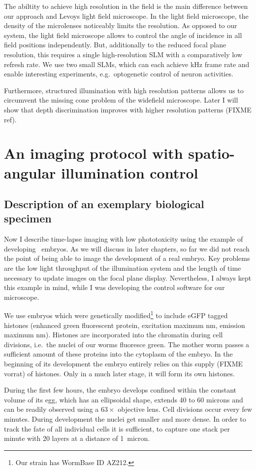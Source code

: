 The abiltity to achieve high resolution in the field is the main
difference between our approach and Levoys light field microscope.  In
the light field microscope, the density of the microlenses noticeably
limits the resolution. As opposed to our system, the light field microscope allows to
control the angle of incidence in all field positions independently.
But, additionally to the reduced focal plane resolution, this requires a single high-resolution SLM with a comparatively
low refresh rate. We use two small SLMs, which can each achieve
\unit[1]{kHz} frame rate and enable interesting experiments,
e.g.\ optogenetic control of neuron activities.

Furthermore, structured illumination with high resolution patterns allows us to
circumvent the missing cone problem of the widefield microscope.
Later I will show that depth
discrimination improves with higher resolution patterns (FIXME ref).
\section{An imaging protocol with spatio-angular illumination control}
\subsection{Description of an exemplary biological specimen}
Now I describe time-lapse imaging with low phototoxicity using the
example of developing \celegans\ embryos. As we will discuss in later chapters, so far we did not reach
the point of being able to image the development of a real embryo. Key
problems are  the low light throughput of the illumination
system and the length of time necessary to update images on the focal
plane display. Nevertheless, I always kept this example in mind,
while I was developing the control software for our microscope.

We use embryos which  were genetically modified\footnote{Our strain has WormBase ID AZ212.}
to include eGFP tagged histones (enhanced green fluorescent protein,
excitation maximum \unit[488]{nm}, emission maximum
\unit[509]{nm}). Histones are incorporated into the chromatin during cell
divisions, i.e.\ the nuclei of our worms fluoresce green.
 The mother worm passes a sufficient amount of these
proteins into the cytoplasm of the embryo. In the beginning of its development the embryo
entirely relies on this supply  (FIXME vorrat) of histones. Only in a much later stage,
it will form its own histones. 

During the first few hours, the embryo develops confined within the
constant volume of its egg, which has an ellipsoidal shape,
extends 40 to 60 microns and can be readily observed using a
$63\times$ objective lens. Cell divisions occur every few minutes.
During development the nuclei get smaller and more
dense. In order to track the fate of all individual cells it is sufficient, to
capture one stack per minute with 20 layers at a distance of 1~micron.
